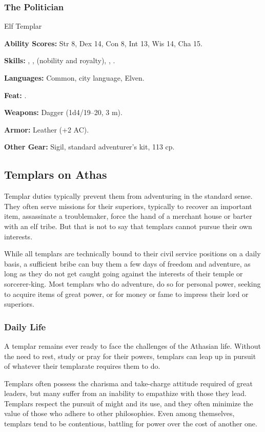 \subsubsection{The Politician}
Elf Templar

\textbf{Ability Scores:} Str 8, Dex 14, Con 8, Int 13, Wis 14, Cha 15.

\textbf{Skills:} , ,  (nobility and royalty), , .

\textbf{Languages:} Common, city language, Elven.

\textbf{Feat:} .

\textbf{Weapons:} Dagger (1d4/19--20, 3 m).

\textbf{Armor:} Leather (+2 AC).

\textbf{Other Gear:} Sigil, standard adventurer's kit, 113 cp.

\subsection{Templars on Athas}

Templar duties typically prevent them from adventuring in the standard sense. They often serve missions for their superiors, typically to recover an important item, assassinate a troublemaker, force the hand of a merchant house or barter with an elf tribe. But that is not to say that templars cannot pursue their own interests.

While all templars are technically bound to their civil service positions on a daily basis, a sufficient bribe can buy them a few days of freedom and adventure, as long as they do not get caught going against the interests of their temple or sorcerer-king. Most templars who do adventure, do so for personal power, seeking to acquire items of great power, or for money or fame to impress their lord or superiors.

\subsubsection{Daily Life}
A templar remains ever ready to face the challenges of the Athasian life. Without the need to rest, study or pray for their powers, templars can leap up in pursuit of whatever their templarate requires them to do.

Templars often possess the charisma and take-charge attitude required of great leaders, but many suffer from an inability to empathize with those they lead. Templars respect the pursuit of might and its use, and they often minimize the value of those who adhere to other philosophies. Even among themselves, templars tend to be contentious, battling for power over the cost of another one.

